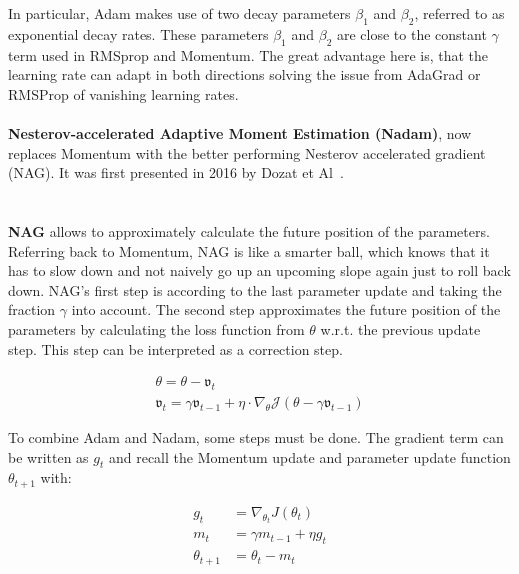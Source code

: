 In particular, Adam makes use of two decay parameters $\beta_1$ and $\beta_2$, referred to as exponential decay rates.
These parameters $\beta_1$ and $\beta_2$ are close to the constant $\gamma$ term used in RMSprop and Momentum.
The great advantage here is, that the learning rate can adapt in both directions solving the issue from AdaGrad or
RMSProp of vanishing learning rates.
\\\mbox{}\\
\textbf{Nesterov-accelerated Adaptive Moment Estimation (Nadam)},
now replaces Momentum with the better performing
Nesterov accelerated gradient (NAG).
It was first presented in 2016 by Dozat et Al~\cite{nadam}.\\
\\\mbox{}\\
\textbf{NAG} allows to approximately calculate the future position of the parameters.
Referring back to Momentum, NAG is like a smarter ball, which knows that it has to slow down and not naively go up an upcoming
slope again just to roll back down.
NAG's first step is according to the last parameter update and taking the fraction $\gamma$ into account.
The second step approximates the future position of the parameters by calculating the loss function from $\theta$ w.r.t.
the previous update step.
This step can be interpreted as a correction step.

\begin{align}
    \theta = \theta - \mathfrak{v}_t \label{eqn:nag:1}\\
    \mathfrak{v}_t = \gamma\mathfrak{v}_{t-1} + \eta\cdot\nabla_\theta\mathcal{J}(\theta-\gamma\mathfrak{v}_{t-1}) \label{eqn:nag:2}
\end{align}

To combine Adam and Nadam, some steps must be done.
The gradient term can be written as $g_t$ and recall the Momentum update and parameter update function $\theta_{t+1}$ with:

\begin{align}
g_t &= \nabla_{\theta_t}J(\theta_t) \label{eqn:nadam:1} \\
m_t &= \gamma m_{t-1} + \eta g_t \label{eqn:nadam:2}\\
\theta_{t+1} &= \theta_t - m_t \label{eqn:nadam:3}
\end{align}

